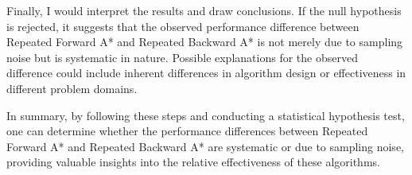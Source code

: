 Finally, I would interpret the results and draw conclusions. If the null hypothesis is rejected, it suggests that the observed performance difference between Repeated Forward A* and Repeated Backward A* is not merely due to sampling noise but is systematic in nature. Possible explanations for the observed difference could include inherent differences in algorithm design or effectiveness in different problem domains.

In summary, by following these steps and conducting a statistical hypothesis test, one can determine whether the performance differences between Repeated Forward A* and Repeated Backward A* are systematic or due to sampling noise, providing valuable insights into the relative effectiveness of these algorithms.